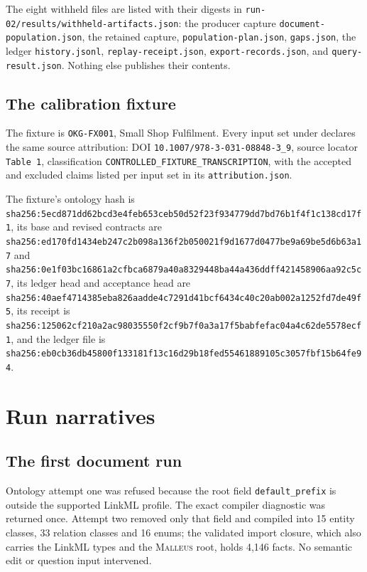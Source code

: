 \documentclass[10pt]{article}
\newcommand{\malleus}{\textsc{Malleus}}
\newcommand{\code}[1]{\texttt{#1}}
\newcommand{\digest}[1]{{\scriptsize\nolinkurl{sha256:#1}}}
\begin{document}
The eight withheld files are listed with their digests in \code{run-02/results/withheld-artifacts.json}: the producer capture \code{document-population.json}, the retained capture, \code{population-plan.json}, \code{gaps.json}, the ledger \code{history.jsonl}, \code{replay-receipt.json}, \code{export-records.json}, and \code{query-result.json}. Nothing else publishes their contents.

\subsection{The calibration fixture}

The fixture is \code{OKG-FX001}, Small Shop Fulfilment. Every input set under {\scriptsize{}} declares the same source attribution: DOI {\small\nolinkurl{10.1007/978-3-031-08848-3_9}}, source locator \code{Table 1}, classification \code{CONTROLLED\_FIXTURE\_TRANSCRIPTION}, with the accepted and excluded claims listed per input set in its \code{attribution.json}.

The fixture's ontology hash is \digest{5ecd871dd62bcd3e4feb653ceb50d52f23f934779dd7bd76b1f4f1c138cd17f1}, its base and revised contracts are \digest{ed170fd1434eb247c2b098a136f2b050021f9d1677d0477be9a69be5d6b63a17} and \digest{0e1f03bc16861a2cfbca6879a40a8329448ba44a436ddff421458906aa92c5c7}, its ledger head and acceptance head are \digest{40aef4714385eba826aadde4c7291d41bcf6434c40c20ab002a1252fd7de49f5}, its receipt is \digest{125062cf210a2ac98035550f2cf9b7f0a3a17f5babfefac04a4c62de5578ecf1}, and the ledger file is \digest{eb0cb36db45800f133181f13c16d29b18fed55461889105c3057fbf15b64fe94}.

\section{Run narratives}
\label{app:narratives}

\subsection{The first document run}
\label{app:b1}

Ontology attempt one was refused because the root field \code{default\_prefix} is outside the supported LinkML profile. The exact compiler diagnostic was returned once. Attempt two removed only that field and compiled into 15 entity classes, 33 relation classes and 16 enums; the validated import closure, which also carries the LinkML types and the \malleus{} root, holds 4,146 facts. No semantic edit or question input intervened.
\end{document}
